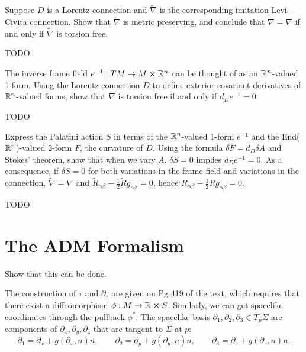 \documentclass[10pt]{article}
\begin{document}
\begin{example}
	Suppose $D$ is a Lorentz connection and $\tilde \nabla$ is the corresponding imitation Levi-Civita connection. Show that $\tilde \nabla$ is metric preserving, and conclude that $\tilde \nabla =\nabla$ if and only if $\tilde \nabla$ is torsion free.
\end{example}
\sol TODO


\begin{example}
	The inverse frame field $e^{-1}: TM \to M \cross \mathbb{R}^n$ can be thought of as an $\mathbb{R}^n$-valued 1-form. Using the Lorentz connection $D$ to define exterior covariant derivatives of $\mathbb{R}^n$-valued forms, show that $\tilde \nabla$ is torsion free if and only if $d_De^{-1}=0$.
\end{example}
\sol TODO


\begin{example}
	Express the Palatini action $S$ in terms of the $\mathbb{R}^n$-valued 1-form $e^{-1}$ and the End($\mathbb{R}^n$)-valued 2-form $F$, the curvature of $D$. Using the formula $\delta F=d_D\delta A$ and Stokes' theorem, show that when we vary $A$, $\delta S=0$ implies $d_De^{-1}=0$. As a consequence, if $\delta S=0$ for both variations in the frame field and variations in the connection, $\tilde \nabla =\nabla$ and $\tilde{R}_{\alpha\beta}-\frac12 \tilde{R}g_{\alpha\beta}=0$, hence $R_{\alpha\beta}-\frac12 Rg_{\alpha\beta}=0$.
\end{example}
\sol TODO







\newpage
\section{The ADM Formalism}\label{b3c4}






\begin{example}
	Show that this can be done.
\end{example}
\sol The construction of $\tau$ and $\partial_\tau$ are given on Pg 419 of the text, which requires that there exist a diffeomorphism $\phi:M\to\mathbb{R}\cross S$. Similarly, we can get spacelike coordinates through the pullback $\phi^*$.
The spacelike basis $\partial_1, \partial_2, \partial_3 \in T_p\Sigma$ are components of $\partial_x, \partial_y, \partial_z$ that are tangent to $\Sigma$ at $p$:
$$
\partial_1 = \partial_x + g(\partial_x, n)n, \qquad
\partial_2 = \partial_y + g(\partial_y, n)n, \qquad
\partial_3 = \partial_z + g(\partial_z, n)n.
$$
\end{document}
